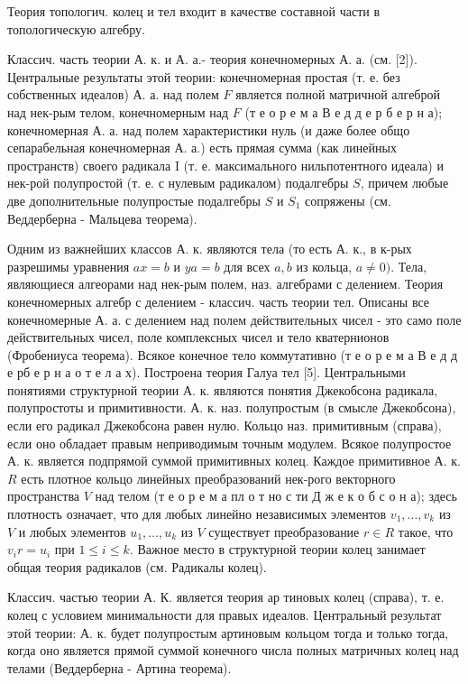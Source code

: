 \documentclass[10pt]{article}
\begin{document}
Теория топологич. колец и тел входит в качестве составной части в топологическую алгебру.



Классич. часть теории А. к. и А. а.- теория конечномерных А. а. (см. [2]). Центральные результаты этой теории: конечномерная простая (т. е. без собственных идеалов) А. а. над полем $F$ является полной матричной алгеброй над нек-рым телом, конечномерным над $F$ (т е о р е м а В е д д е р б е р н а); конечномерная А. а. над полем характеристики нуль (и даже более общо сепарабельная конечномерная А. а.) есть прямая сумма (как линейных пространств) своего радикала I (т. е. максимального нильпотентного идеала) и нек-рой полупростой (т. е. с нулевым радикалом) подалгебры $S$, причем любые две дополнительные полупростые подалгебры $S$ и $S_{1}$ сопряжены (см. Веддерберна - Мальцева теорема).



Одним из важнейших классов А. к. являются тела (то есть А. к., в к-рых разрешимы уравнения $a x=b$ и $y a=b$ для всех $a, b$ из кольца, $a \neq 0)$. Тела, являющиеся алгеорами над нек-рым полем, наз. алгебрами с делением. Теория конечномерных алгебр с делением - классич. часть теории тел. Описаны все конечномерные А. а. с делением над полем действительных чисел - это само поле действительных чисел, поле комплексных чисел и тело кватернионов (Фробениуса теорема). Всякое конечное тело коммутативно (т е о р е м а В е д д е рб е р н а о т е л а х). Построена теория Галуа тел [5]. Центральными понятиями структурной теории А. к. являются понятия Джекобсона радикала, полупростоты и примитивности. А. к. наз. полупростым (в смысле Джекобсона), если его радикал Джекобсона равен нулю. Кольцо наз. примитивным (справа), если оно обладает правым неприводимым точным модулем. Всякое полупростое А. к. является подпрямой суммой примитивных колец. Каждое примитивное А. к. $R$ есть плотное кольцо линейных преобразований нек-рого векторного пространства $V$ над телом (т е о р е м а пл о т но с ти Д ж е к о б с о н а); здесь плотность означает, что для любых линейно независимых элементов $v_{1}, \ldots, v_{k}$ из $V$ и любых элементов $u_{1}, \ldots, u_{k}$ из $V$ существует преобразование $r \in R$ такое, что $v_{i} r=u_{i}$ при $1 \leqslant i \leqslant k$. Важное место в структурной теории колец занимает общая теория радикалов (см. Радикалы колец).



Классич. частью теории А. К. является теория ар тиновых колец (справа), т. е. колец с условием минимальности для правых идеалов. Центральный результат этой теории: А. к. будет полупростым артиновым кольцом тогда и только тогда, когда оно является прямой суммой конечного числа полных матричных колец над телами (Веддерберна - Артина теорема).
\end{document}
